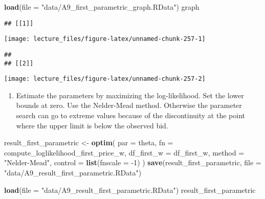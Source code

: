 \documentclass[
]{book}
\newenvironment{Shaded}{\begin{snugshade}}{\end{snugshade}}
\newcommand{\DataTypeTok}[1]{\textcolor[rgb]{0.13,0.29,0.53}{#1}}
\newcommand{\DecValTok}[1]{\textcolor[rgb]{0.00,0.00,0.81}{#1}}
\newcommand{\KeywordTok}[1]{\textcolor[rgb]{0.13,0.29,0.53}{\textbf{#1}}}
\newcommand{\NormalTok}[1]{#1}
\newcommand{\StringTok}[1]{\textcolor[rgb]{0.31,0.60,0.02}{#1}}
\providecommand{\tightlist}{%
  \setlength{\itemsep}{0pt}\setlength{\parskip}{0pt}}
\begin{document}
\begin{Shaded}
\begin{Highlighting}[]
\KeywordTok{load}\NormalTok{(}\DataTypeTok{file =} \StringTok{"data/A9_first_parametric_graph.RData"}\NormalTok{)}
\NormalTok{graph}
\end{Highlighting}
\end{Shaded}

\begin{verbatim}
## [[1]]
\end{verbatim}

\begin{center}\texttt{[image: lecture\_files/figure-latex/unnamed-chunk-257-1]} \end{center}

\begin{verbatim}
## 
## [[2]]
\end{verbatim}

\begin{center}\texttt{[image: lecture\_files/figure-latex/unnamed-chunk-257-2]} \end{center}

\begin{enumerate}
\def\labelenumi{\arabic{enumi}.}
\setcounter{enumi}{8}
\tightlist
\item
  Estimate the parameters by maximizing the log-likelihood. Set the lower bounds at zero. Use the Nelder-Mead method. Otherwise the parameter search can go to extreme values because of the discontinuity at the point where the upper limit is below the observed bid.
\end{enumerate}

\begin{Shaded}
\begin{Highlighting}[]
\NormalTok{result_first_parametric <-}
\StringTok{  }\KeywordTok{optim}\NormalTok{(}
    \DataTypeTok{par =}\NormalTok{ theta,}
    \DataTypeTok{fn =}\NormalTok{ compute_loglikelihood_first_price_w,}
    \DataTypeTok{df_first_w =}\NormalTok{ df_first_w,}
    \DataTypeTok{method =} \StringTok{"Nelder-Mead"}\NormalTok{,}
    \DataTypeTok{control =} \KeywordTok{list}\NormalTok{(}\DataTypeTok{fnscale =} \DecValTok{-1}\NormalTok{)}
\NormalTok{  )}
\KeywordTok{save}\NormalTok{(result_first_parametric, }\DataTypeTok{file =} \StringTok{"data/A9_result_first_parametric.RData"}\NormalTok{)}
\end{Highlighting}
\end{Shaded}

\begin{Shaded}
\begin{Highlighting}[]
\KeywordTok{load}\NormalTok{(}\DataTypeTok{file =} \StringTok{"data/A9_result_first_parametric.RData"}\NormalTok{)}
\NormalTok{result_first_parametric}
\end{Highlighting}
\end{Shaded}
\end{document}
